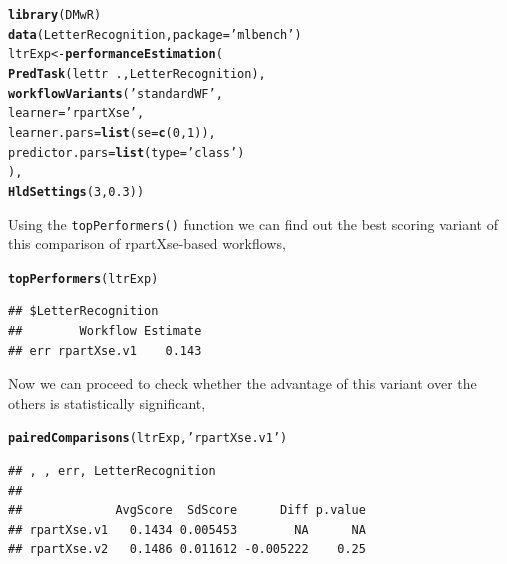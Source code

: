 \documentclass[10pt,a4paper]{article}\usepackage[]{graphicx}\usepackage[]{color}
\makeatletter
\newcommand{\hlnum}[1]{\textcolor[rgb]{0.686,0.059,0.569}{#1}}%
\newcommand{\hlstr}[1]{\textcolor[rgb]{0.192,0.494,0.8}{#1}}%
\newcommand{\hlopt}[1]{\textcolor[rgb]{0,0,0}{#1}}%
\newcommand{\hlstd}[1]{\textcolor[rgb]{0.345,0.345,0.345}{#1}}%
\newcommand{\hlkwb}[1]{\textcolor[rgb]{0.69,0.353,0.396}{#1}}%
\newcommand{\hlkwc}[1]{\textcolor[rgb]{0.333,0.667,0.333}{#1}}%
\newcommand{\hlkwd}[1]{\textcolor[rgb]{0.737,0.353,0.396}{\textbf{#1}}}%
\newenvironment{kframe}{%
 \def\at@end@of@kframe{}%
 \ifinner\ifhmode%
  \def\at@end@of@kframe{\end{minipage}}%
  \begin{minipage}{\columnwidth}%
 \fi\fi%
 \def\FrameCommand##1{\hskip\@totalleftmargin \hskip-\fboxsep
 \colorbox{shadecolor}{##1}\hskip-\fboxsep
     \hskip-\linewidth \hskip-\@totalleftmargin \hskip\columnwidth}%
 \MakeFramed {\advance\hsize-\width
   \@totalleftmargin\z@ \linewidth\hsize
   \@setminipage}}%
 {\par\unskip\endMakeFramed%
 \at@end@of@kframe}
\newenvironment{knitrout}{}{} %
\makeatother
\begin{document}
\begin{knitrout}
\color{fgcolor}\begin{kframe}
\begin{alltt}
\hlkwd{library}\hlstd{(DMwR)}
\hlkwd{data}\hlstd{(LetterRecognition,}\hlkwc{package}\hlstd{=}\hlstr{'mlbench'}\hlstd{)}
\hlstd{ltrExp} \hlkwb{<-} \hlkwd{performanceEstimation}\hlstd{(}
  \hlkwd{PredTask}\hlstd{(lettr} \hlopt{~} \hlstd{.,LetterRecognition),}
  \hlkwd{workflowVariants}\hlstd{(}\hlstr{'standardWF'}\hlstd{,}
           \hlkwc{learner}\hlstd{=}\hlstr{'rpartXse'}\hlstd{,}
           \hlkwc{learner.pars}\hlstd{=}\hlkwd{list}\hlstd{(}\hlkwc{se}\hlstd{=}\hlkwd{c}\hlstd{(}\hlnum{0}\hlstd{,}\hlnum{1}\hlstd{)),}
           \hlkwc{predictor.pars}\hlstd{=}\hlkwd{list}\hlstd{(}\hlkwc{type}\hlstd{=}\hlstr{'class'}\hlstd{)}
           \hlstd{),}
  \hlkwd{HldSettings}\hlstd{(}\hlnum{3}\hlstd{,}\hlnum{0.3}\hlstd{))}
\end{alltt}
\end{kframe}
\end{knitrout}


Using the \texttt{topPerformers()} function we can find out the best
scoring variant of this comparison of rpartXse-based workflows,

\begin{knitrout}
\color{fgcolor}\begin{kframe}
\begin{alltt}
\hlkwd{topPerformers}\hlstd{(ltrExp)}
\end{alltt}
\begin{verbatim}
## $LetterRecognition
##        Workflow Estimate
## err rpartXse.v1    0.143
\end{verbatim}
\end{kframe}
\end{knitrout}


Now we can proceed to check whether the advantage of this variant over
the others is statistically significant,

\begin{knitrout}
\color{fgcolor}\begin{kframe}
\begin{alltt}
\hlkwd{pairedComparisons}\hlstd{(ltrExp,}\hlstr{'rpartXse.v1'}\hlstd{)}
\end{alltt}
\begin{verbatim}
## , , err, LetterRecognition
## 
##             AvgScore  SdScore      Diff p.value
## rpartXse.v1   0.1434 0.005453        NA      NA
## rpartXse.v2   0.1486 0.011612 -0.005222    0.25
\end{verbatim}
\end{kframe}
\end{knitrout}
\end{document}
